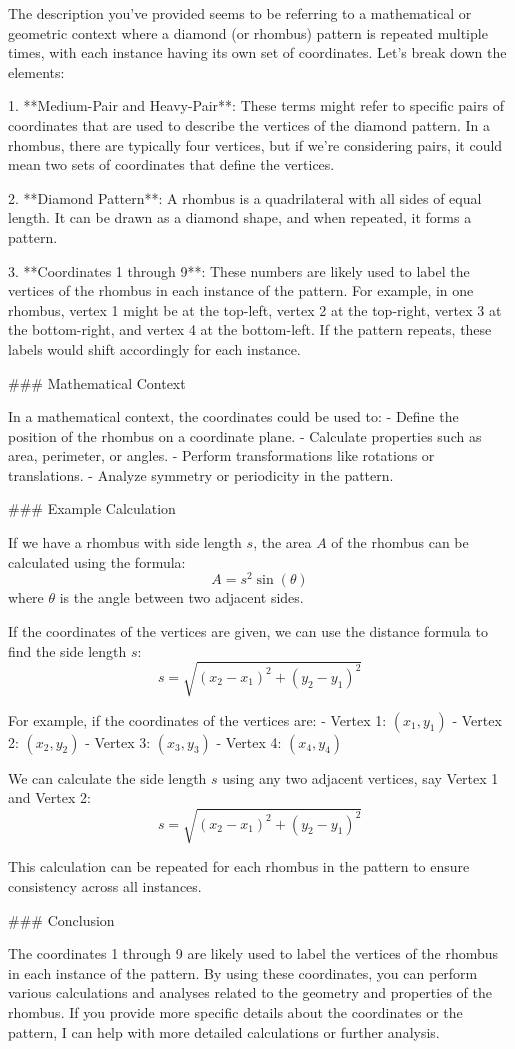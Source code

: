 The description you've provided seems to be referring to a mathematical or geometric context where a diamond (or rhombus) pattern is repeated multiple times, with each instance having its own set of coordinates. Let's break down the elements:

1. **Medium-Pair and Heavy-Pair**: These terms might refer to specific pairs of coordinates that are used to describe the vertices of the diamond pattern. In a rhombus, there are typically four vertices, but if we're considering pairs, it could mean two sets of coordinates that define the vertices.

2. **Diamond Pattern**: A rhombus is a quadrilateral with all sides of equal length. It can be drawn as a diamond shape, and when repeated, it forms a pattern.

3. **Coordinates 1 through 9**: These numbers are likely used to label the vertices of the rhombus in each instance of the pattern. For example, in one rhombus, vertex 1 might be at the top-left, vertex 2 at the top-right, vertex 3 at the bottom-right, and vertex 4 at the bottom-left. If the pattern repeats, these labels would shift accordingly for each instance.

### Mathematical Context

In a mathematical context, the coordinates could be used to:
- Define the position of the rhombus on a coordinate plane.
- Calculate properties such as area, perimeter, or angles.
- Perform transformations like rotations or translations.
- Analyze symmetry or periodicity in the pattern.

### Example Calculation

If we have a rhombus with side length \( s \), the area \( A \) of the rhombus can be calculated using the formula:
\[ A = s^2 \sin(\theta) \]
where \( \theta \) is the angle between two adjacent sides.

If the coordinates of the vertices are given, we can use the distance formula to find the side length \( s \):
\[ s = \sqrt{(x_2 - x_1)^2 + (y_2 - y_1)^2} \]

For example, if the coordinates of the vertices are:
- Vertex 1: \((x_1, y_1)\)
- Vertex 2: \((x_2, y_2)\)
- Vertex 3: \((x_3, y_3)\)
- Vertex 4: \((x_4, y_4)\)

We can calculate the side length \( s \) using any two adjacent vertices, say Vertex 1 and Vertex 2:
\[ s = \sqrt{(x_2 - x_1)^2 + (y_2 - y_1)^2} \]

This calculation can be repeated for each rhombus in the pattern to ensure consistency across all instances.

### Conclusion

The coordinates 1 through 9 are likely used to label the vertices of the rhombus in each instance of the pattern. By using these coordinates, you can perform various calculations and analyses related to the geometry and properties of the rhombus. If you provide more specific details about the coordinates or the pattern, I can help with more detailed calculations or further analysis.